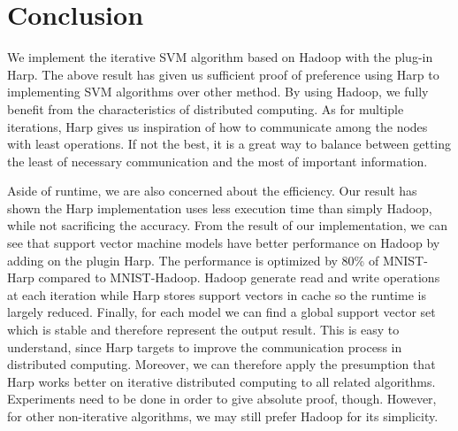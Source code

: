 \section{Conclusion}
We implement the iterative SVM algorithm based on Hadoop with the plug-in Harp. The above result has given us sufficient proof of preference using Harp to implementing SVM algorithms over other method. By using Hadoop, we fully benefit from the characteristics of distributed computing. As for multiple iterations, Harp gives us inspiration of how to communicate among the nodes with least operations. If not the best, it is a great way to balance between getting the least of necessary communication and the most of important information.

Aside of runtime, we are also concerned about the efficiency. Our result has shown the Harp implementation uses less execution time than simply Hadoop, while not sacrificing the accuracy. From the result of our implementation, we can see that support vector machine models have better performance on Hadoop by adding on the plugin Harp. The performance is optimized by 80\% of MNIST-Harp compared to MNIST-Hadoop. Hadoop generate read and write operations at each iteration while Harp stores support vectors in cache so the runtime is largely reduced. Finally, for each model we can find a global support vector set which is stable and therefore represent the output result. This is easy to understand, since Harp targets to improve the communication process in distributed computing. Moreover, we can therefore apply the presumption that Harp works better on iterative distributed computing to all related algorithms. Experiments need to be done in order to give absolute proof, though. However, for other non-iterative algorithms, we may still prefer Hadoop for its simplicity.
